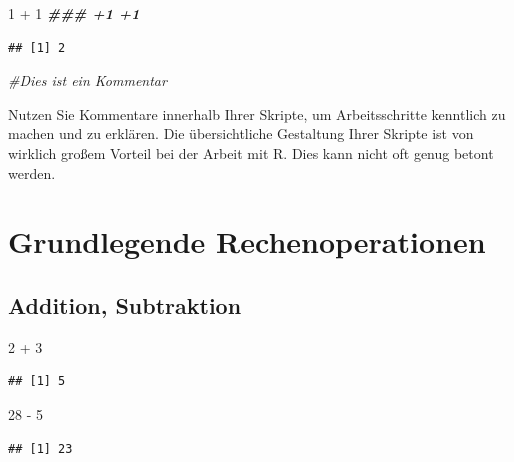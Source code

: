 \documentclass[
]{book}
\newenvironment{Shaded}{\begin{snugshade}}{\end{snugshade}}
\newcommand{\CommentTok}[1]{\textcolor[rgb]{0.56,0.35,0.01}{\textit{#1}}}
\newcommand{\DecValTok}[1]{\textcolor[rgb]{0.00,0.00,0.81}{#1}}
\newcommand{\DocumentationTok}[1]{\textcolor[rgb]{0.56,0.35,0.01}{\textbf{\textit{#1}}}}
\newcommand{\SpecialCharTok}[1]{\textcolor[rgb]{0.00,0.00,0.00}{#1}}
\begin{document}
\begin{Shaded}
\begin{Highlighting}[]
\DecValTok{1} \SpecialCharTok{+} \DecValTok{1} \DocumentationTok{\#\#\# +1 +1}
\end{Highlighting}
\end{Shaded}

\begin{verbatim}
## [1] 2
\end{verbatim}

\begin{Shaded}
\begin{Highlighting}[]
\CommentTok{\#Dies ist ein Kommentar}
\end{Highlighting}
\end{Shaded}

Nutzen Sie Kommentare innerhalb Ihrer Skripte, um Arbeitsschritte kenntlich zu machen und zu erklären. Die übersichtliche Gestaltung Ihrer Skripte ist von wirklich großem Vorteil bei der Arbeit mit R. Dies kann nicht oft genug betont werden.

\hypertarget{grundlegende-rechenoperationen}{%
\section{Grundlegende Rechenoperationen}\label{grundlegende-rechenoperationen}}

\hypertarget{addition-subtraktion}{%
\subsection*{Addition, Subtraktion}\label{addition-subtraktion}}

\begin{Shaded}
\begin{Highlighting}[]
\DecValTok{2} \SpecialCharTok{+} \DecValTok{3}  
\end{Highlighting}
\end{Shaded}

\begin{verbatim}
## [1] 5
\end{verbatim}

\begin{Shaded}
\begin{Highlighting}[]
\DecValTok{28} \SpecialCharTok{{-}} \DecValTok{5}  
\end{Highlighting}
\end{Shaded}

\begin{verbatim}
## [1] 23
\end{verbatim}
\end{document}
